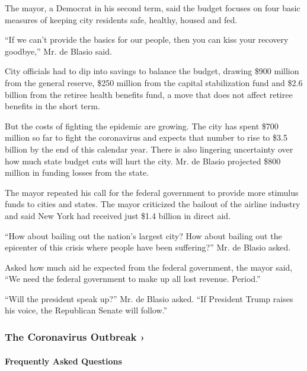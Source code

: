The mayor, a Democrat in his second term, said the budget focuses on
four basic measures of keeping city residents safe, healthy, housed and
fed.

``If we can't provide the basics for our people, then you can kiss your
recovery goodbye,'' Mr. de Blasio said.

City officials had to dip into savings to balance the budget, drawing
\$900 million from the general reserve, \$250 million from the capital
stabilization fund and \$2.6 billion from the retiree health benefits
fund, a move that does not affect retiree benefits in the short term.

But the costs of fighting the epidemic are growing. The city has spent
\$700 million so far to fight the coronavirus and expects that number to
rise to \$3.5 billion by the end of this calendar year. There is also
lingering uncertainty over how much state budget cuts will hurt the
city. Mr. de Blasio projected \$800 million in funding losses from the
state.

The mayor repeated his call for the federal government to provide more
stimulus funds to cities and states. The mayor criticized the bailout of
the airline industry and said New York had received just \$1.4 billion
in direct aid.

``How about bailing out the nation's largest city? How about bailing out
the epicenter of this crisis where people have been suffering?'' Mr. de
Blasio asked.

Asked how much aid he expected from the federal government, the mayor
said, ``We need the federal government to make up all lost revenue.
Period.''

``Will the president speak up?'' Mr. de Blasio asked. ``If President
Trump raises his voice, the Republican Senate will follow.''

\href{https://www.nytimes3xbfgragh.onion/news-event/coronavirus?action=click\&pgtype=Article\&state=default\&region=MAIN_CONTENT_3\&context=storylines_faq}{}

\hypertarget{the-coronavirus-outbreak-}{%
\subsubsection{The Coronavirus Outbreak
›}\label{the-coronavirus-outbreak-}}

\hypertarget{frequently-asked-questions}{%
\paragraph{Frequently Asked
Questions}\label{frequently-asked-questions}}

